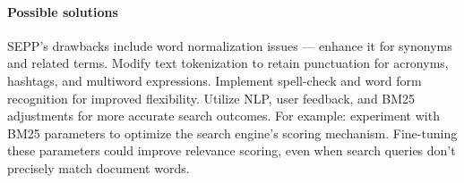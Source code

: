 \paragraph{Possible solutions}
SEPP's drawbacks include word normalization issues --- enhance it for synonyms and related terms. Modify text tokenization to retain punctuation for acronyms, hashtags, and multiword expressions. Implement spell-check and word form recognition for improved flexibility. Utilize NLP, user feedback, and BM25 adjustments for more accurate search outcomes. For example: experiment with BM25 parameters to optimize the search engine's scoring mechanism. Fine-tuning these parameters could improve relevance scoring, even when search queries don't precisely match document words.

